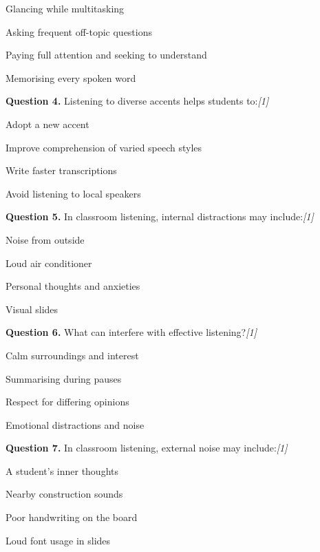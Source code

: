 \documentclass[11pt,a4paper]{article}
\newcommand{\pts}[1]{\hfill   \textit{[#1]}}
\begin{document}
\begin{parts}
  \item Glancing while multitasking
  \item Asking frequent off-topic questions
  \item Paying full attention and seeking to understand
  \item Memorising every spoken word
\end{parts}

\medskip


\noindent   \textbf{Question 4.} Listening to diverse accents helps students to:\pts{1}

\begin{parts}
  \item Adopt a new accent
  \item Improve comprehension of varied speech styles
  \item Write faster transcriptions
  \item Avoid listening to local speakers
\end{parts}

\medskip


\noindent   \textbf{Question 5.} In classroom listening, internal distractions may include:\pts{1}

\begin{parts}
  \item Noise from outside
  \item Loud air conditioner
  \item Personal thoughts and anxieties
  \item Visual slides
\end{parts}

\medskip


\noindent   \textbf{Question 6.} What can interfere with effective listening?\pts{1}

\begin{parts}
  \item Calm surroundings and interest
  \item Summarising during pauses
  \item Respect for differing opinions
  \item Emotional distractions and noise
\end{parts}

\medskip


\noindent   \textbf{Question 7.} In classroom listening, external noise may include:\pts{1}

\begin{parts}
  \item A student's inner thoughts
  \item Nearby construction sounds
  \item Poor handwriting on the board
  \item Loud font usage in slides
\end{parts}
\end{document}
